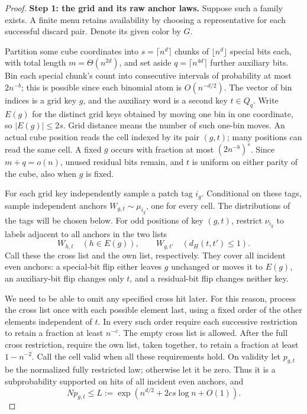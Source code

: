 \begin{proof}
\noindent\textbf{Step 1: the grid and its raw anchor laws.}\quad
Suppose such a family exists. A finite menu retains availability by
choosing a representative for each successful discard pair. Denote its
given color by \(G\).

Partition some cube coordinates into \(s=\lceil n^d\rceil\) chunks of
\(\lfloor n^d\rfloor\) special bits each, with total length
\(m=\Theta(n^{2d})\), and set aside \(q=\lceil n^{4d}\rceil\) further
auxiliary bits. Bin each special chunk's count into consecutive intervals
of probability at most \(2n^{-b}\); this is possible since each binomial
atom is \(O(n^{-d/2})\). The vector of bin indices is a grid key \(g\),
and the auxiliary word is a second key \(t\in Q_q\). Write \(E(g)\) for
the distinct grid keys obtained by moving one bin in one coordinate, so
\(|E(g)|\le2s\). Grid distance means the number of such one-bin moves.
An actual cube position reads the cell indexed by its
pair \((g,t)\); many positions can read the same cell. A fixed \(g\)
occurs with fraction at most \((2n^{-b})^s\). Since \(m+q=o(n)\), unused
residual bits remain, and \(t\) is uniform on either parity of the cube,
also when \(g\) is fixed.

For each grid key independently sample a patch tag \(i_g\). Conditional
on these tags, sample independent anchors
\(W_{g,t}\sim\mu_{i_g}\), one for every cell. The distributions of the
tags will be chosen below. For odd positions of key \((g,t)\), restrict
\(\nu_{i_g}\) to labels adjacent to all anchors in the two lists
\[
 W_{h,t}\quad(h\in E(g)),\qquad
 W_{g,t'}\quad(d_H(t,t')\le1).
\]
Call these the cross list and the own list, respectively. They cover all
incident even anchors: a special-bit flip either leaves \(g\) unchanged
or moves it to \(E(g)\), an auxiliary-bit flip changes only \(t\), and a
residual-bit flip changes neither key.

We need to be able to omit any specified cross hit later. For this
reason, process the cross list once with each possible element last,
using a fixed order of the other elements independent of \(t\). In every
such order require each successive restriction to retain a fraction at
least \(n^{-c}\). The empty cross list is allowed. After the full cross
restriction, require the own list, taken together, to retain a fraction
at least \(1-n^{-2}\). Call the cell valid when all these requirements
hold. On validity let \(p_{g,t}\) be the normalized fully restricted
law; otherwise let it be zero. Thus it is a subprobability supported on
hits of all incident even anchors, and
\[
 Np_{g,t}\le L:=\exp(n^{d/2}+2c s\log n+O(1)).
\]


\end{proof}
